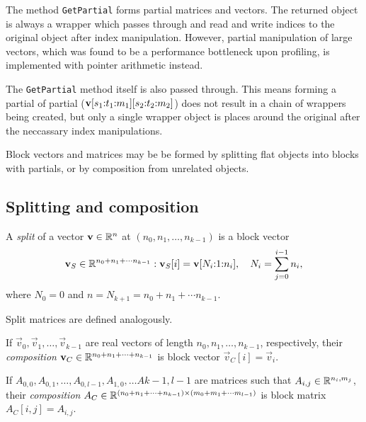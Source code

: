 The method \texttt{GetPartial} forms partial matrices and vectors. The
returned object is always a wrapper which passes through and read and
write indices to the original object after index
manipulation. However, partial manipulation of large vectors, which
was found to be a performance bottleneck upon profiling, is
implemented with pointer arithmetic instead.

The \texttt{GetPartial} method itself is also passed through. This
means forming a partial of partial
($\bm{\mathrm{v}}[s_1{:}t_1{:}m_1][s_2{:}t_2{:}m_2]$) does not
result in a chain of wrappers being created, but only a single wrapper
object is places around the original after the neccassary index
manipulations.

Block vectors and matrices may be be formed by splitting flat objects
into blocks with partials, or by composition from unrelated objects.

\subsection{Splitting and composition}

\begin{dfn}
  A \emph{split} of a vector $\bm{\mathrm{v}} \in \mathbb{R}^n$ at $(n_0, n_1,
  \ldots, n_{k - 1})$ is a block vector
  \begin{equation}
    \label{eq:operations:ds:vector-split}
    \bm{\mathrm{v}}_S \in \mathbb{R}^{n_0 + n_1 + \cdots n_{k - 1}} : \bm{\mathrm{v}}_S[i]
    = \bm{\mathrm{v}}[N_i{:}1{:}n_i], \quad N_i = \sum_{j = 0}^{i - 1} n_i \text,
  \end{equation}
  where $N_0 = 0$ and $n = N_{k + 1} = n_0 + n_1 + \cdots n_{k - 1}$.
\end{dfn}
Split matrices are defined analogously.

\begin{dfn}
  \label{dfn:operations:ds:vector-compose}
  If $\vec{v}_0, \vec{v}_1, \ldots, \vec{v}_{k - 1}$ are real vectors
  of length $n_0, n_1, \ldots, n_{k - 1}$, respectively, their
  \emph{composition}
  $\bm{\mathrm{v}}_C \in \mathbb{R}^{n_0 + n_1 + \cdots + n_{k - 1}}$ is block
  vector $\vec{v}_C[i] = \vec{v}_i$.
\end{dfn}

\begin{dfn}
  \label{dfn:operations:ds:matrix-compose}
  If
  $A_{0, 0}, A_{0, 1}, \ldots, A_{0, l - 1}, A_{1, 0}, \ldots A{k - 1,
    l - 1}$
  are matrices such that $A_{i, j} \in \mathbb{R}^{n_i, m_j}$, their
  \emph{composition}
  $A_C \in \mathbb{R}^{(n_0 + n_1 + \cdots + n_{k - 1}) \times (m_0 +
    m_1 + \cdots m_{l - 1})}$ is block
  matrix $A_C[i, j] = A_{i, j}$.
\end{dfn}

